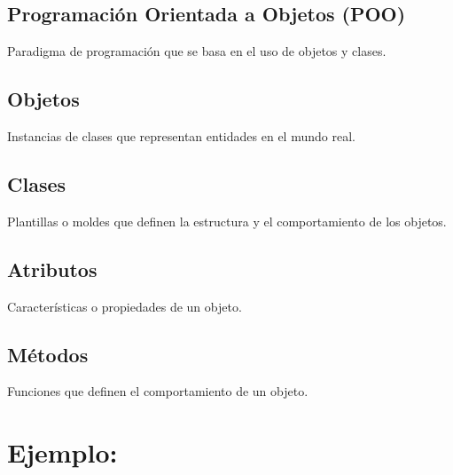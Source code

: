 \documentclass[
  a4paper,
  DIV=11,
  numbers=noendperiod,
  onepage,
  openany]{scrreprt}
\begin{document}
\hypertarget{programaciuxf3n-orientada-a-objetos-poo}{%
\subsection{Programación Orientada a Objetos
(POO)}\label{programaciuxf3n-orientada-a-objetos-poo}}

Paradigma de programación que se basa en el uso de objetos y clases.

\hypertarget{objetos}{%
\subsection{Objetos}\label{objetos}}

Instancias de clases que representan entidades en el mundo real.

\hypertarget{clases}{%
\subsection{Clases}\label{clases}}

Plantillas o moldes que definen la estructura y el comportamiento de los
objetos.

\hypertarget{atributos}{%
\subsection{Atributos}\label{atributos}}

Características o propiedades de un objeto.

\hypertarget{muxe9todos}{%
\subsection{Métodos}\label{muxe9todos}}

Funciones que definen el comportamiento de un objeto.

\hypertarget{ejemplo-48}{%
\section{Ejemplo:}\label{ejemplo-48}}
\end{document}

